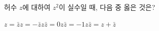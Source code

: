 허수 $z$에 대하여 $z^2$이 실수일 때, 다음 중 옳은 것은? 
\begin{choices32}{$z=\bar{z}$}{$z=-\bar{z}$}{$z\bar{z}=0$}{$z\bar{z}=-1$}{$z\bar{z}=z+\bar{z}$}\end{choices32}
